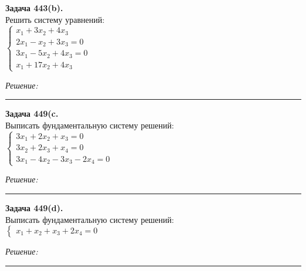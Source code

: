 \documentclass[a4paper, 12pt]{article}
\newenvironment{problem}[2][Задача]
{ \begin{mdframed}[backgroundcolor=gray!10] \textbf{#1 #2.} \\}
	{  \end{mdframed}}
\newenvironment{solution}
{\textit{Решение:}\vspace{.1cm}\\}
{\vspace{.1cm}\noindent\rule{7in}{1.5pt}}
\begin{document}
\begin{problem}{443(b)}
Решить систему уравнений:\\
$\left\{\begin{array}{l}
x_1+3x_2+4x_3\\
2x_1-x_2+3x_3=0\\
3x_1-5x_2+4x_3=0\\
x_1+17x_2+4x_3
\end{array}\right.$

\end{problem}
\begin{solution}


\end{solution} 

\begin{problem}{449(c}
Выписать фундаментальную систему решений:\\
$\left\{\begin{array}{l}
3x_1+2x_2+x_3=0\\
3x_2+2x_3+x_4=0\\
3x_1-4x_2-3x_3-2x_4=0
\end{array}\right.$

\end{problem}
\begin{solution}


\end{solution} 

\begin{problem}{449(d)}
Выписать фундаментальную систему решений:\\
$\left\{\begin{array}{l}
x_1+x_2+x_3+2x_4=0
\end{array}\right.$

\end{problem}
\begin{solution}


\end{solution} 
\end{document}
